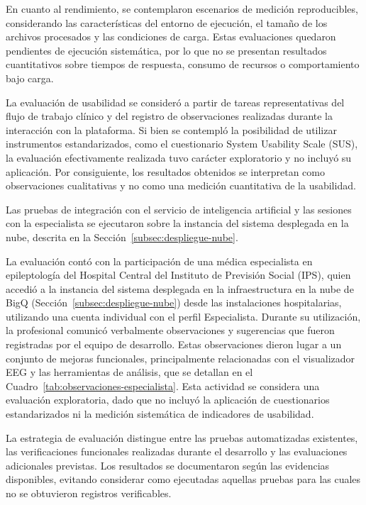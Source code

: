 En cuanto al rendimiento, se contemplaron escenarios de medición reproducibles, considerando las características del entorno de ejecución, el tamaño de los archivos procesados y las condiciones de carga. Estas evaluaciones quedaron pendientes de ejecución sistemática, por lo que no se presentan resultados cuantitativos sobre tiempos de respuesta, consumo de recursos o comportamiento bajo carga.


La evaluación de usabilidad se consideró a partir de tareas representativas del flujo de trabajo clínico y del registro de observaciones realizadas durante la interacción con la plataforma. Si bien se contempló la posibilidad de utilizar instrumentos estandarizados, como el cuestionario System Usability Scale (SUS), la evaluación efectivamente realizada tuvo carácter exploratorio y no incluyó su aplicación. Por consiguiente, los resultados obtenidos se interpretan como observaciones cualitativas y no como una medición cuantitativa de la usabilidad.


Las pruebas de integración con el servicio de inteligencia artificial y las sesiones con la especialista se ejecutaron sobre la instancia del sistema desplegada en la nube, descrita en la Sección~\ref{subsec:despliegue-nube}.

La evaluación contó con la participación de una médica especialista en epileptología del Hospital Central del Instituto de Previsión Social (IPS), quien accedió a la instancia del sistema desplegada en la infraestructura en la nube de BigQ (Sección~\ref{subsec:despliegue-nube}) desde las instalaciones hospitalarias, utilizando una cuenta individual con el perfil Especialista. Durante su utilización, la profesional comunicó verbalmente observaciones y sugerencias que fueron registradas por el equipo de desarrollo. Estas observaciones dieron lugar a un conjunto de mejoras funcionales, principalmente relacionadas con el visualizador EEG y las herramientas de análisis, que se detallan en el Cuadro~\ref{tab:observaciones-especialista}. Esta actividad se considera una evaluación exploratoria, dado que no incluyó la aplicación de cuestionarios estandarizados ni la medición sistemática de indicadores de usabilidad.


La estrategia de evaluación distingue entre las pruebas automatizadas existentes, las verificaciones funcionales realizadas durante el desarrollo y las evaluaciones adicionales previstas. Los resultados se documentaron según las evidencias disponibles, evitando considerar como ejecutadas aquellas pruebas para las cuales no se obtuvieron registros verificables.


